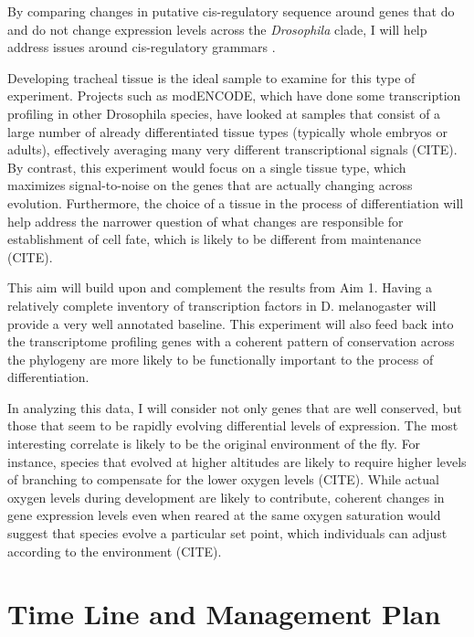 \documentclass{proposal}
\begin{document}
By comparing changes in putative cis-regulatory sequence around genes that do and do not change expression levels across the {\em Drosophila} clade, I will help address issues around cis-regulatory grammars \cite{Papatsenko:2009de, Hare:2008fi}.



Developing tracheal tissue is the ideal sample to examine for this type of experiment.
Projects such as modENCODE, which have done some transcription profiling in other Drosophila species, have looked at samples that consist of a large number of already differentiated tissue types (typically whole embryos or adults), effectively averaging many very different transcriptional signals (CITE).
By contrast, this experiment would focus on a single tissue type, which maximizes signal-to-noise on the genes that are actually changing across evolution.
Furthermore, the choice of a tissue in the process of differentiation will help address the narrower question of what changes are responsible for establishment of cell fate, which is likely to be different from maintenance (CITE).

This aim will build upon and complement the results from Aim 1.
Having a relatively complete inventory of transcription factors in D.  melanogaster will provide a very well annotated baseline.
This experiment will also feed back into the transcriptome profiling genes with a coherent pattern of conservation across the phylogeny are more likely to be functionally important to the process of differentiation.

In analyzing this data, I will consider not only genes that are well conserved, but those that seem to be rapidly evolving differential levels of expression.
The most interesting correlate is likely to be the original environment of the fly.
For instance, species that evolved at higher altitudes are likely to require higher levels of branching to compensate for the lower oxygen levels (CITE).
While actual oxygen levels during development are likely to contribute, coherent changes in gene expression levels even when reared at the same oxygen saturation would suggest that species evolve a particular set point, which individuals can adjust according to the environment (CITE).



\section{Time Line and Management Plan}
\end{document}
